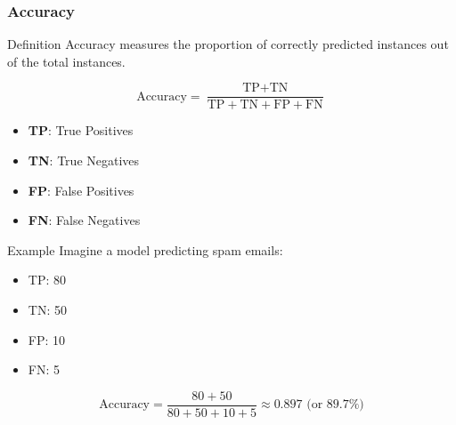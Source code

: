 \documentclass[aspectratio=169]{beamer}
\begin{document}
\begin{frame}[fragile]
    \frametitle{Accuracy}
    \begin{block}{Definition}
        Accuracy measures the proportion of correctly predicted instances out of the total instances.
    \end{block}

    \begin{equation}
        \text{Accuracy} = \frac{\text{TP} + \text{TN}}{\text{TP} + \text{TN} + \text{FP} + \text{FN}}
    \end{equation}
    
    \begin{itemize}
        \item \textbf{TP}: True Positives
        \item \textbf{TN}: True Negatives
        \item \textbf{FP}: False Positives
        \item \textbf{FN}: False Negatives
    \end{itemize}

    \begin{block}{Example}
        Imagine a model predicting spam emails:
        \begin{itemize}
            \item TP: 80
            \item TN: 50
            \item FP: 10
            \item FN: 5
        \end{itemize}
        \[
        \text{Accuracy} = \frac{80 + 50}{80 + 50 + 10 + 5} \approx 0.897 \text{ (or 89.7\%)}
        \]
    \end{block}
\end{frame}
\end{document}
